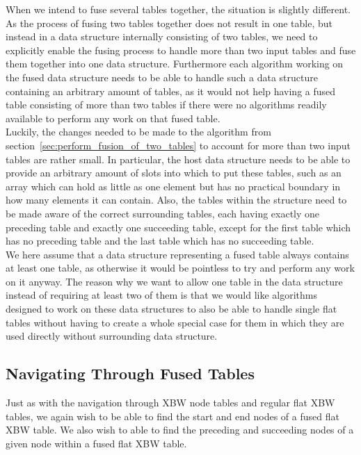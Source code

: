 \documentclass[a4paper,12pt,twoside,BCOR=10mm]{scrbook}
\begin{document}
When we intend to fuse several tables together, the situation is slightly different.
As the process of fusing two tables together does not result in one table,
but instead in a data structure internally consisting of two tables,
we need to explicitly enable the fusing process to handle more than two input tables
and fuse them together into one data structure.
Furthermore each algorithm working on the fused data structure needs to be able to
handle such a data structure containing an arbitrary amount of tables,
as it would not help having a fused table consisting of more than two tables if there
were no algorithms readily available to perform any work on that fused table. \\
Luckily, the changes needed to be made to the algorithm from section~\ref{sec:perform_fusion_of_two_tables} to
account for more than two input tables are rather small.
In particular, the host data structure needs to be able to provide an arbitrary amount of slots into
which to put these tables, such as an array which can hold as little as one element but has no practical boundary
in how many elements it can contain. Also, the tables within the structure need to be made aware of the
correct surrounding tables, each having exactly one preceding table and exactly one succeeding table,
except for the first table which has no preceding table and the last table which has no succeeding table. \\
We here assume that a data structure representing a fused table always contains at least
one table, as otherwise it would be pointless to try and perform any work on it anyway.
The reason why we want to allow one table in the data structure instead of requiring at least two
of them is that we would like algorithms designed to work on these data structures to also be
able to handle single flat tables without having to create a whole special case for them in which
they are used directly without surrounding data structure.

\subsection{Navigating Through Fused Tables}
\label{sec:fused_table_navigation}

Just as with the navigation through XBW node tables and regular flat XBW tables,
we again wish to be able to find the start and end nodes of a fused flat XBW table.
We also wish to able to find the preceding and succeeding nodes of a
given node within a fused flat XBW table.
\end{document}
